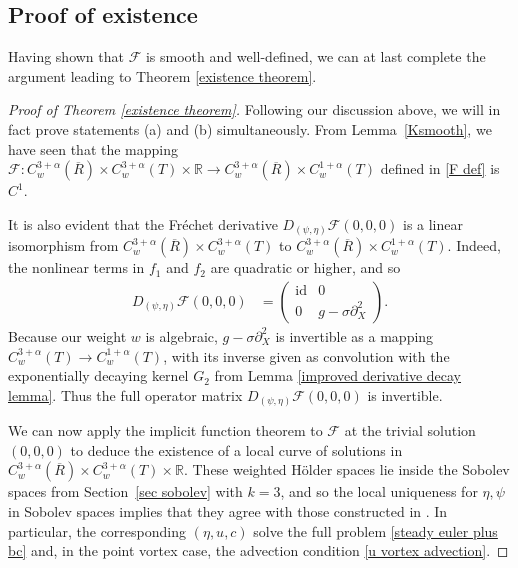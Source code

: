 \documentclass[11pt,reqno]{amsart}
\newcommand\F{\mathcal F}
\newcommand{\R}{\mathbb{R}}
\theoremstyle{plain}
\theoremstyle{remark}
\numberwithin{equation}{section}
\begin{document}
\subsection{Proof of existence}


Having shown that $\F$ is smooth and well-defined, we can at last complete the argument leading to Theorem \ref{existence theorem}.
\begin{proof}[Proof of Theorem \ref{existence theorem}]
Following our discussion above, we will in fact prove statements (a) and (b) simultaneously.  From Lemma~\ref{Ksmooth}, we have seen that the mapping $\mathcal{F}: C^{3+\alpha}_w(\overline R) \times C^{3+\alpha}_w(T) \times \R \to C^{3+\alpha}_w(\overline R) \times C^{1+\alpha}_w(T)$ defined in \eqref{F def} is $C^1$.   

It is also evident that the Fr\'echet derivative $D_{(\psi,\eta)}\F(0,0,0)$ is a linear isomorphism from $C^{3+\alpha}_w(\overline R) \times C^{3+\alpha}_w(T)$ to $C^{3+\alpha}_w(\overline R) \times C^{1+\alpha}_w(T)$. Indeed, the nonlinear terms in $f_1$ and $f_2$ are quadratic or higher, and so 
    \begin{align*}
      D_{(\psi,\eta)}\F(0,0,0)
      &= 
      \begin{pmatrix}
        \mathrm{id}  & 0 \\
        0 & g-\sigma \partial_X^2
      \end{pmatrix}.
    \end{align*}
    Because our weight $w$ is algebraic, $g-\sigma \partial_X^2$ is invertible as a mapping
    $C^{3+\alpha}_w (T) \to C^{1+\alpha}_w(T)$, with its inverse given
    as convolution with the exponentially decaying kernel $G_2$ from Lemma \ref{improved derivative decay lemma}.
    Thus the full operator matrix $D_{(\psi,\eta)}\F(0,0,0)$ is 
    invertible.
    
    We can now apply the implicit function theorem to $\mathcal{F}$ at the trivial solution $(0,0,0)$ to deduce the existence of a local curve of solutions in $C^{3+\alpha}_w(\overline R) \times C^{3+\alpha}_w(T) \times \R$.  These weighted H\"older spaces lie inside the Sobolev spaces from Section~\ref{sec sobolev} with $k=3$, and so the local uniqueness for $\eta,\psi$ in Sobolev spaces implies that they agree with those constructed in \cite{shatah2013travelling}. In particular, the corresponding $(\eta,u,c)$ solve the full problem \eqref{steady euler plus bc} and, in the point vortex case, the advection condition \eqref{u vortex advection}.
   

\end{proof}
\end{document}
